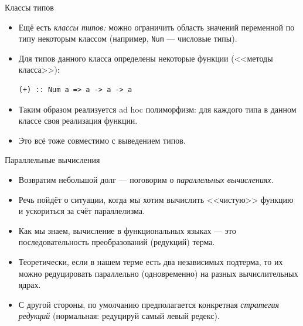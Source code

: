\documentclass[xcolor=dvipsnames]{beamer}
\begin{document}
\begin{frame}[fragile]{Классы типов}

\begin{itemize}[<+->]
 \item Ещё есть {\em классы типов:} можно ограничить область значений переменной по типу некоторым классом (например, \texttt{Num} --- числовые типы).
  \item Для типов данного класса определены некоторые функции (<<методы класса>>):
 \begin{verbatim}
(+) :: Num a => a -> a -> a
 \end{verbatim}
\item Таким образом реализуется ad hoc полиморфизм: для каждого типа в данном классе своя реализация функции.
\item Это всё тоже совместимо с выведением типов.
 \end{itemize}

\end{frame}


\begin{frame}{Параллельные вычисления}
 
 \begin{itemize}[<+->]
  \item Возвратим небольшой долг --- поговорим о {\em параллельных вычислениях.}
  \item Речь пойдёт о ситуации, когда мы хотим вычислить <<чистую>> функцию и ускориться за счёт параллелизма.
  \item Как мы знаем, вычисление в функциональных языках --- это последовательность преобразований (редукций) терма.
  \item Теоретически, если в нашем терме есть два независимых подтерма, то их можно редуцировать параллельно (одновременно) на разных вычислительных ядрах.
  \item С другой стороны, по умолчанию предполагается конкретная {\em стратегия редукций} (нормальная: редуцируй самый левый редекс).
 \end{itemize}

\end{frame}
\end{document}
